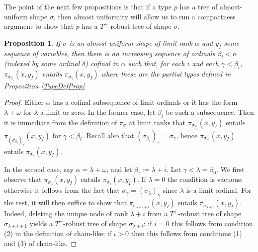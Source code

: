 \documentclass{article}
\newtheorem{prop}[theorem]{Proposition}
\theoremstyle{remark}
\theoremstyle{definition}
\begin{document}
The point of the next few propositions is that if a type $p$ has a tree of almost-uniform shape $\sigma$, then almost uniformity will allow us to run a compactness argument to show that $p$ has a $T^+$-robust tree of shape $\sigma$.

\begin{prop}\label{AlmostUnifProp}
    If $\sigma$ is an almost uniform shape of limit rank $\alpha$ and $y_I$ some sequence of variables, then there is an increasing sequence of ordinals $\beta_i<\alpha$ (indexed by some ordinal $\delta$) cofinal in $\alpha$ such that, for each $i$ and each $\gamma<\beta_i$, $\pi_{\sigma_{\beta_i}}(x,y_I)$ entails $\pi_{\sigma_\gamma}(x,y_I)$ where these are the partial types defined in Proposition \ref{TypeDefProp} 
\end{prop}
\begin{proof}
    Either $\alpha$ has a cofinal subsequence of limit ordinals or it has the form $\lambda+\omega$ for $\lambda$ a limit or zero. In the former case, let $\beta_i$ be such a subsequence. Then it is immediate from the definition of $\pi_\sigma$ at limit ranks that $\pi_{\sigma_{\beta_i}}(x,y_I)$ entails $\pi_{(\sigma_{\beta_i})_\gamma}(x,y_I)$ for $\gamma<\beta_i$. Recall also that $(\sigma_{\beta_i})_{\gamma}=\sigma_\gamma$, hence $\pi_{\sigma_{\beta_i}}(x,y_I)$ entails $\pi_{\sigma_{\gamma}}(x,y_I)$.

    In the second case, say $\alpha=\lambda+\omega$, and let $\beta_i:=\lambda+i$. Let $\gamma<\lambda=\beta_0$. We first observe that $\pi_{\sigma_\lambda}(x,y_I)$ entails $\pi_{\sigma_\gamma}(x,y_I)$. If $\lambda=0$ the condition is vacuous; otherwise it follows from the fact that $\sigma_\gamma=(\sigma_\lambda)_\gamma$ since $\lambda$ is a limit ordinal. For the rest, it will then suffice to show that $\pi_{\sigma_{\lambda+i+1}}(x,y_I)$ entails $\pi_{\sigma_{\lambda+i}}(x,y_I)$. Indeed, deleting the unique node of rank $\lambda+i$  from a $T^+$-robust tree of shape $\sigma_{\lambda+i+1}$ yields a $T^+$-robust tree of shape $\sigma_{\lambda+i}$: if $i=0$ this follows from condition (2) in the definition of chain-like; if $i>0$ then this follows from conditions (1) and (3) of chain-like.
\end{proof}
\end{document}
